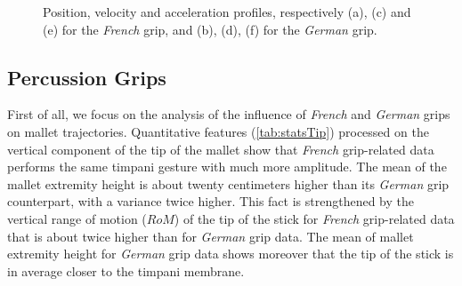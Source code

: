 \begin{figure}
\begin{center}
		\hspace{6mm}
	\end{center}
	\vspace{-0.5cm}
	\caption[Position, velocity and acceleration profiles]{Position, velocity and acceleration profiles, respectively (a), (c) and (e) for the \emph{French} grip, and (b), (d), (f) for the \emph{German} grip.}
	\label{fig:profiles}
\end{figure}


		\subsection{Percussion Grips}
		\label{subsec:Analysis_TimpaniAnalysis_Grips}

First of all, we focus on the analysis of the influence of \emph{French} and \emph{German} grips on mallet trajectories. Quantitative features (\mytabname \ref{tab:statsTip}) processed on the vertical component of the tip of the mallet show that \emph{French} grip-related data performs the same timpani gesture with much more amplitude. The mean of the mallet extremity height is about twenty centimeters higher than its \emph{German} grip counterpart, with a variance twice higher. This fact is strengthened by the vertical range of motion ($RoM$) of the tip of the stick for \emph{French} grip-related data that is about twice higher than for \emph{German} grip data. The mean of mallet extremity height for \emph{German} grip data shows moreover that the tip of the stick is in average closer to the timpani membrane.\\

